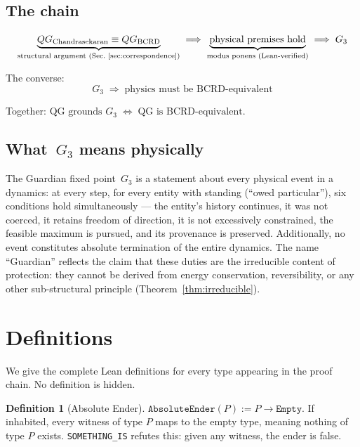 \documentclass[11pt,a4paper]{article}
\theoremstyle{definition}
\newtheorem{definition}[theorem]{Definition}
\theoremstyle{remark}
\begin{document}
\subsection{The chain}

\begin{equation}\label{eq:chain}
\underbrace{QG_{\mathrm{Chandrasekaran}} \equiv QG_{\mathrm{BCRD}}}_{\text{structural argument (Sec.~\ref{sec:correspondence})}}
\;\Longrightarrow\;
\underbrace{\text{physical premises hold}}_{\text{modus ponens (Lean-verified)}}
\;\Longrightarrow\;
G_3
\end{equation}

The converse:
\begin{equation}\label{eq:converse}
G_3 \;\Longrightarrow\; \text{physics must be BCRD-equivalent}
\end{equation}

Together: $\text{QG grounds } G_3 \;\Longleftrightarrow\; \text{QG is BCRD-equivalent}$.

\subsection{What~$G_3$ means physically}

The Guardian fixed point~$G_3$ is a statement about every physical event in a dynamics: at every step, for every entity with standing (``owed particular''), six conditions hold simultaneously --- the entity's history continues, it was not coerced, it retains freedom of direction, it is not excessively constrained, the feasible maximum is pursued, and its provenance is preserved. Additionally, no event constitutes absolute termination of the entire dynamics. The name ``Guardian'' reflects the claim that these duties are the irreducible content of protection: they cannot be derived from energy conservation, reversibility, or any other sub-structural principle (Theorem~\ref{thm:irreducible}).

\section{Definitions}\label{sec:defs}

We give the complete Lean definitions for every type appearing in the proof chain. No definition is hidden.

\begin{definition}[Absolute Ender]\label{def:ender}
$\texttt{AbsoluteEnder}(P) := P \to \texttt{Empty}$. If inhabited, every witness of type $P$ maps to the empty type, meaning nothing of type $P$ exists. \texttt{SOMETHING\_IS} refutes this: given any witness, the ender is false.
\end{definition}
\end{document}
